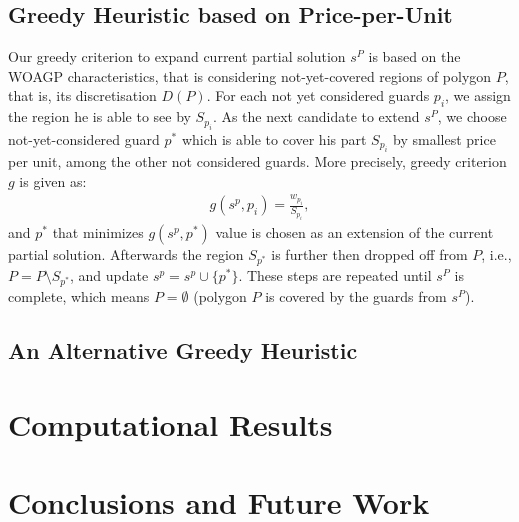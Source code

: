 \documentclass[runningheads,a4paper]{llncs}
\begin{document}
      \subsection{Greedy Heuristic based on Price-per-Unit}
       Our greedy criterion to expand current partial solution $s^P$  is based on the WOAGP characteristics, that is considering not-yet-covered regions of polygon $P$, that is, its discretisation $D(P)$. For each not yet considered guards $p_i$, we assign the region he is able to see by $S_{p_i}$. As the next candidate to extend $s^P$, we choose not-yet-considered guard $p^*$ which is able to cover his part $S_{p_i}$ by smallest price per unit, among the other not considered guards. More precisely, greedy criterion $g$ is given as:
       \begin{align}
            g(s^p, p_i) = \frac{w_{p_i}}{S_{p_i}},
       \end{align}
       and $p^*$ that minimizes $g(s^p, p^*)$ value is chosen as an extension of the current partial solution.
       Afterwards the region $S_{p^*}$ is further then dropped off from $P$, i.e., $P=P \setminus S_{p^*}$, and update $s^p= s^p \cup \{p^*\}$.  These steps are repeated until $s^P$ is complete, which means $P = \emptyset$ (polygon $P$ is covered by the guards from $s^P$).  
        \subsection{An Alternative Greedy Heuristic}
     \section{Computational Results}
     
     \section{Conclusions and Future Work}
     
     
  
    
    
\end{document}
